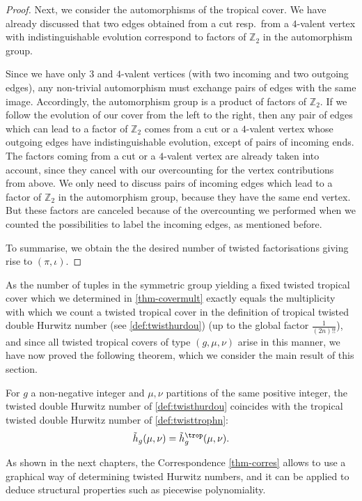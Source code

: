 \begin{proof}
Next, we consider the automorphisms of the tropical cover. We have already discussed that two edges obtained from a cut resp.\ from a $4$-valent vertex with indistinguishable evolution correspond to factors of $\mathbb{Z}_2$ in the  automorphism  group. 

Since we have only $3$ and $4$-valent vertices (with two incoming and two outgoing edges), any non-trivial automorphism  must exchange pairs of edges with the same image. Accordingly, the automorphism group is a product of factors of $\mathbb{Z}_2$. If we follow the evolution of our cover from the left to the right, then any pair of edges which can lead to a factor of $\mathbb{Z}_2$ comes from a cut or a $4$-valent vertex whose outgoing edges have indistinguishable evolution, except of pairs of incoming ends. The  factors coming from a cut or a $4$-valent vertex are already taken into account, since they cancel with our overcounting for the vertex contributions from above. We only need to discuss pairs of incoming edges which lead to a factor of $\mathbb{Z}_2$ in the automorphism group, because they have the same end vertex.
But these factors are canceled because of the overcounting we performed when we counted the possibilities to label the incoming edges, as mentioned before.

To summarise, we obtain the the desired number of twisted factorisations giving rise to $(\pi,\iota)$.
\end{proof}

As the number of tuples in the symmetric group yielding a fixed twisted tropical cover which we determined in \cref{thm-covermult} exactly equals the multiplicity with which we count a twisted tropical cover in the definition of tropical twisted double Hurwitz number (see \cref{def:twisthurdou}) (up to the global factor $\frac{1}{(2n)!!}$), and since all twisted tropical covers of type $(g,\mu,\nu)$ arise in this manner, we have now proved the following theorem, which we consider the main result of this section.

\begin{theo}
\label{thm-corres}
For $g$ a non-negative integer and $\mu,\nu$ partitions of the same positive integer, the twisted double Hurwitz number of \cref{def:twisthurdou} coincides with the tropical twisted double Hurwitz number of \cref{def:twisttrophn}:
$$\tilde{h}_g(\mu,\nu)=\tilde{h}^{\trop}_g(\mu,\nu).$$
\end{theo}

As shown in the next chapters, the Correspondence \cref{thm-corres} allows to use a graphical way of determining twisted Hurwitz numbers, and it can be applied to deduce structural properties such as piecewise polynomiality.
